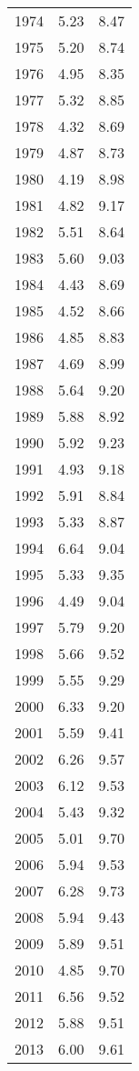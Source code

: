 \begin{tabular}{lrr}
1974 &    5.23 &    8.47 \\
1975 &    5.20 &    8.74 \\
1976 &    4.95 &    8.35 \\
1977 &    5.32 &    8.85 \\
1978 &    4.32 &    8.69 \\
1979 &    4.87 &    8.73 \\
1980 &    4.19 &    8.98 \\
1981 &    4.82 &    9.17 \\
1982 &    5.51 &    8.64 \\
1983 &    5.60 &    9.03 \\
1984 &    4.43 &    8.69 \\
1985 &    4.52 &    8.66 \\
1986 &    4.85 &    8.83 \\
1987 &    4.69 &    8.99 \\
1988 &    5.64 &    9.20 \\
1989 &    5.88 &    8.92 \\
1990 &    5.92 &    9.23 \\
1991 &    4.93 &    9.18 \\
1992 &    5.91 &    8.84 \\
1993 &    5.33 &    8.87 \\
1994 &    6.64 &    9.04 \\
1995 &    5.33 &    9.35 \\
1996 &    4.49 &    9.04 \\
1997 &    5.79 &    9.20 \\
1998 &    5.66 &    9.52 \\
1999 &    5.55 &    9.29 \\
2000 &    6.33 &    9.20 \\
2001 &    5.59 &    9.41 \\
2002 &    6.26 &    9.57 \\
2003 &    6.12 &    9.53 \\
2004 &    5.43 &    9.32 \\
2005 &    5.01 &    9.70 \\
2006 &    5.94 &    9.53 \\
2007 &    6.28 &    9.73 \\
2008 &    5.94 &    9.43 \\
2009 &    5.89 &    9.51 \\
2010 &    4.85 &    9.70 \\
2011 &    6.56 &    9.52 \\
2012 &    5.88 &    9.51 \\
2013 &    6.00 &    9.61 \\
\bottomrule
\end{tabular}
